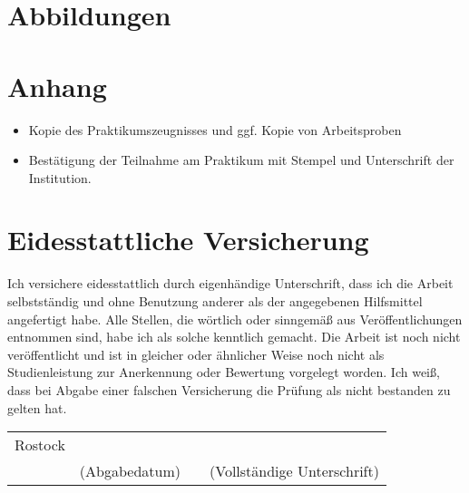 \documentclass{Vorlage}
\begin{document}
\newpage

\section{Abbildungen}

\begin{figure}[H]
    
\end{figure}

\newpage

\section{Anhang}

\begin{itemize}

\item Kopie des Praktikumszeugnisses und ggf. Kopie von Arbeitsproben

\item Bestätigung der Teilnahme am Praktikum mit Stempel und Unterschrift der Institution.

\end{itemize}

\newpage

\section{Eidesstattliche Versicherung}

Ich versichere eidesstattlich durch eigenhändige Unterschrift, dass ich die Arbeit selbstständig und ohne Benutzung anderer als der angegebenen Hilfsmittel angefertigt habe. Alle Stellen, die wörtlich oder sinngemäß aus Veröffentlichungen entnommen sind, habe ich als solche kenntlich gemacht. Die Arbeit ist noch nicht veröffentlicht und ist in gleicher oder ähnlicher Weise noch nicht als Studienleistung zur Anerkennung oder Bewertung vorgelegt worden. Ich weiß, dass bei Abgabe einer falschen Versicherung die Prüfung als nicht bestanden zu gelten hat.

\vspace*{1cm}

\begin{table}[h]
\centering
\begin{tabular}{p{3cm} p{4cm} p{0.5cm} p{6cm}}
Rostock & & &\\[0.5cm]
\cline{2-2} \cline{4-4}
& (Abgabedatum) & & (Vollständige Unterschrift)\\
\end{tabular}
\end{table}
\end{document}
